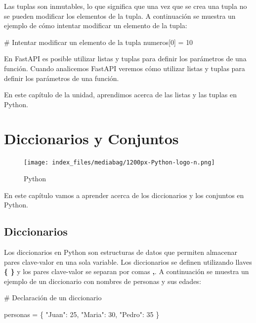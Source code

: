 \documentclass[
  a4paper,
  DIV=11,
  numbers=noendperiod,
  onepage,
  openany]{scrreprt}
\newenvironment{Shaded}{\begin{snugshade}}{\end{snugshade}}
\newcommand{\CommentTok}[1]{\textcolor[rgb]{0.37,0.37,0.37}{#1}}
\newcommand{\DecValTok}[1]{\textcolor[rgb]{0.68,0.00,0.00}{#1}}
\newcommand{\NormalTok}[1]{\textcolor[rgb]{0.00,0.23,0.31}{#1}}
\newcommand{\OperatorTok}[1]{\textcolor[rgb]{0.37,0.37,0.37}{#1}}
\newcommand{\StringTok}[1]{\textcolor[rgb]{0.13,0.47,0.30}{#1}}
\begin{document}
Las tuplas son inmutables, lo que significa que una vez que se crea una
tupla no se pueden modificar los elementos de la tupla. A continuación
se muestra un ejemplo de cómo intentar modificar un elemento de la
tupla:

\begin{Shaded}
\begin{Highlighting}[]
\CommentTok{\# Intentar modificar un elemento de la tupla}
\NormalTok{numeros[}\DecValTok{0}\NormalTok{] }\OperatorTok{=} \DecValTok{10}
\end{Highlighting}
\end{Shaded}

En FastAPI es posible utilizar listas y tuplas para definir los
parámetros de una función. Cuando analicemos FastAPI veremos cómo
utilizar listas y tuplas para definir los parámetros de una función.

En este capítulo de la unidad, aprendimos acerca de las listas y las
tuplas en Python.

\chapter{Diccionarios y Conjuntos}\label{diccionarios-y-conjuntos}

\begin{figure}[H]

{\centering \texttt{[image: index\_files/mediabag/1200px-Python-logo-n.png]}

}

\caption{Python}

\end{figure}%

En este capítulo vamos a aprender acerca de los diccionarios y los
conjuntos en Python.

\section{Diccionarios}\label{diccionarios}

Los diccionarios en Python son estructuras de datos que permiten
almacenar pares clave-valor en una sola variable. Los diccionarios se
definen utilizando llaves \textbf{\{ \}} y los pares clave-valor se
separan por comas \textbf{,}. A continuación se muestra un ejemplo de un
diccionario con nombres de personas y sus edades:

\begin{Shaded}
\begin{Highlighting}[]
\CommentTok{\# Declaración de un diccionario}

\NormalTok{personas }\OperatorTok{=}\NormalTok{ \{}
    \StringTok{"Juan"}\NormalTok{: }\DecValTok{25}\NormalTok{,}
    \StringTok{"Maria"}\NormalTok{: }\DecValTok{30}\NormalTok{,}
    \StringTok{"Pedro"}\NormalTok{: }\DecValTok{35}
\NormalTok{\}}
\end{Highlighting}
\end{Shaded}
\end{document}
